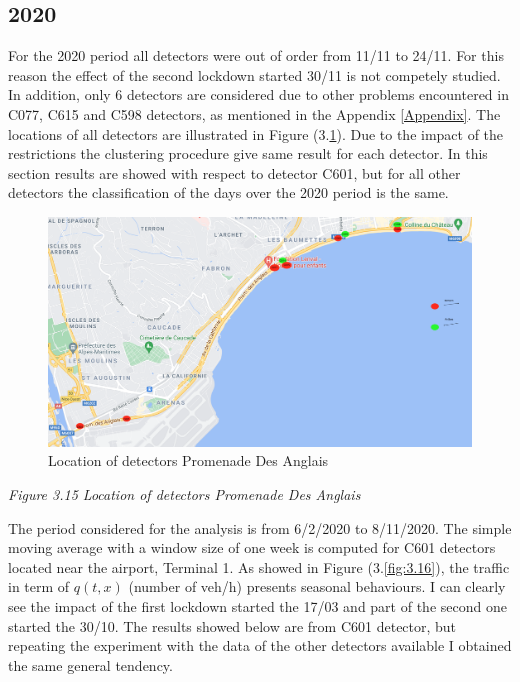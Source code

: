 \documentclass[11pt]{article}
\begin{document}
    \subsection{2020}

    For the 2020 period all detectors were out of order from 11/11 to 24/11.
For this reason the effect of the second lockdown started 30/11 is not
competely studied. In addition, only 6 detectors are considered due to
other problems encountered in C077, C615 and C598 detectors, as
mentioned in the Appendix \ref{Appendix}. The locations of all detectors
are illustrated in Figure (3.\ref{fig:3.15}). Due to the impact of the
restrictions the clustering procedure give same result for each
detector. In this section results are showed with respect to detector
C601, but for all other detectors the classification of the days over
the 2020 period is the same.

    \begin{figure}
    \centering
    \includegraphics{detector promenade.png}
    \caption{Location of detectors Promenade Des Anglais}
    \label{fig:3.15}
\end{figure}

\emph{\small Figure 3.15 Location of detectors Promenade Des Anglais}

    The period considered for the analysis is from 6/2/2020 to 8/11/2020.
The simple moving average with a window size of one week is computed for
C601 detectors located near the airport, Terminal 1. As showed in Figure
(3.\ref{fig:3.16}), the traffic in term of \(q(t,x)\) (number of veh/h)
presents seasonal behaviours. I can clearly see the impact of the first
lockdown started the 17/03 and part of the second one started the 30/10.
The results showed below are from C601 detector, but repeating the
experiment with the data of the other detectors available I obtained the
same general tendency.
\end{document}
